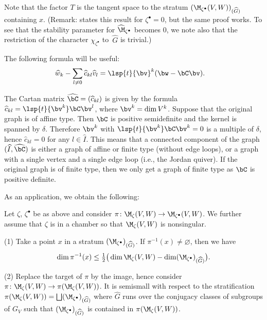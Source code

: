 Note that the factor $T$ is the tangent space to the stratum
$(\M_{\zeta^\bullet}(V,W))_{(\widehat G)}$ containing $x$.
%
(Remark: \cite[3.2.1]{Na-qaff} states this result for $\zeta^\bullet =
0$, but the same proof works. To see that the stability parameter for
$\widehat\M_{\zeta^\bullet}$ becomes $0$, we note also that the
restriction of the character $\chi_{\zeta^\bullet}$ to~$\widehat G$ is
trivial.)

The following formula will be useful:
\begin{equation}\label{eq:weights}
\begin{split}
   & \widehat{w}_k - \sum_{l\neq 0} \widehat{c}_{kl} \widehat{v}_l
   = \lsp{t}{\bv}^k (\bw - \bC \bv).
\end{split}
\end{equation}


\begin{Remark}\label{rem:affine}
  The Cartan matrix $\widehat{\bC} = (\widehat{c}_{kl})$ is given by
  the formula $\widehat{c}_{kl} = \lsp{t}{\bv^k} \bC \bv^l$, where $\bv^k =
  \dim V^k$. Suppose that the original graph is of af\/f\/ine type. Then
  $\bC$ is positive semidef\/inite and the kernel is spanned by
  $\delta$. Therefore $\bv^k$ with $\lsp{t}{\bv^k} \bC \bv^k = 0$ is a multiple
  of $\delta$, hence $\widehat{c}_{kl} = 0$ for any $l\in \widehat I$.
  This means that a connected component of the graph $(\widehat
  I,\widehat\bC)$ is either a graph of af\/f\/ine or f\/inite type (without
  edge loops), or a graph with a single vertex and a single edge loop
  (i.e., the Jordan quiver). If the original graph is of f\/inite type,
  then we only get a graph of f\/inite type as $\bC$ is positive
  def\/inite.
\end{Remark}


As an application, we obtain the following:

\begin{Proposition}\label{prop:semismall}
Let $\zeta$, $\zeta^\bullet$ be as above and consider
$\pi\colon\M_\zeta(V,\linebreak[3]W)\to \M_{\zeta^\bullet}(V,W)$.
%
  We further assume that $\zeta$ is in a chamber so that
  $\M_\zeta(V,W)$ is nonsingular.

\textup{(1)} Take a point $x$ in a stratum $(\M_{\zeta^\bullet})_{(\widehat
  G)}$. If $\pi^{-1}(x)\neq \varnothing$, then we have
\begin{equation*}
  \dim \pi^{-1}(x)
  \le \tfrac12
  \big( \dim \M_\zeta(V,W) - \dim (\M_{\zeta^\bullet})_{(\widehat G)}\big).
\end{equation*}

\textup{(2)} Replace the target of $\pi$ by the image, hence consider
$\pi\colon \M_{\zeta}(V,W)\to \pi(\M_\zeta(V,W))$. It is semismall
with respect to the stratification $\pi(\M_\zeta(V,W)) = \bigsqcup
(\M_{\zeta^\bullet})_{(\widehat G)}$ where $\widehat G$ runs over the
conjugacy classes of subgroups of $G_V$ such that
$(\M_{\zeta^\bullet})_{(\widehat G)}$ is contained in $\pi(\M_\zeta(V,W))$.
\end{Proposition}

